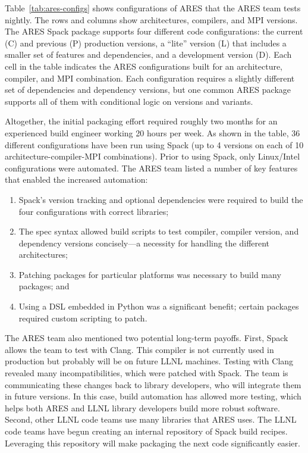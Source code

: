 Table~\ref{tab:ares-configs} shows configurations of ARES that the ARES
team tests nightly.  The rows and columns show architectures, compilers, and MPI versions.
The ARES Spack package supports four different code configurations:
the current (C) and previous (P) production versions, a ``lite'' version (L) that includes
a smaller set of features and dependencies, and a development version (D).
Each cell in the table indicates the ARES configurations built for an architecture,
compiler, and MPI combination. Each configuration requires a slightly different
set of dependencies and dependency versions, but one common ARES package supports
all of them with conditional logic on versions and variants.

Altogether, the initial packaging effort required roughly two months 
for an experienced build engineer working 20 hours per week.
As shown in the table, 36 different configurations have been run using Spack
(up to 4 versions on each of 10 architecture-compiler-MPI combinations).
Prior to using Spack, only Linux/Intel configurations were automated. The ARES 
team listed a number of key features that enabled the increased automation:
\begin{enumerate}
\item Spack's version tracking and optional dependencies were required to
      build the four configurations with correct libraries;
\item The spec syntax allowed build scripts to test compiler,
      compiler version, and dependency versions concisely---a necessity
      for handling the different architectures;
\item Patching packages for particular platforms was
      necessary to build many packages; and
\item Using a DSL embedded in Python was a significant benefit;
      certain packages required custom scripting to patch.
\end{enumerate}

The ARES team also mentioned two potential long-term payoffs. First, Spack 
allows the team to test with Clang.  This compiler is not currently used in
production but probably will be on future LLNL machines. Testing with Clang 
revealed many incompatibilities, which were patched with Spack. The team is 
communicating these changes back to library developers, who will integrate 
them in future versions. In this case, build automation has allowed more 
testing, which helps both ARES and LLNL library developers build more robust 
software. Second, other LLNL code teams use many libraries that ARES uses.
The LLNL code teams have begun creating an internal repository of Spack 
build recipes.  Leveraging this repository will make packaging the next 
code significantly easier.
